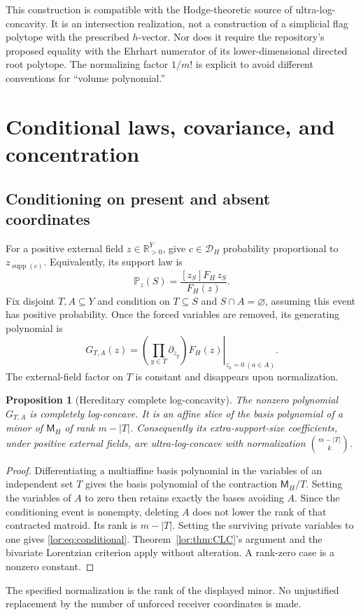 \documentclass[11pt]{article}
\numberwithin{equation}{section}
\newtheorem{proposition}[theorem]{Proposition}
\theoremstyle{definition}
\newcommand{\R}{\mathbb R}
\newcommand{\supp}{\operatorname{supp}}
\newcommand{\PP}{\mathbb P}
\newcommand{\cD}{\mathcal D}
\begin{document}
This construction is compatible with the Hodge-theoretic source of
ultra-log-concavity. It is an intersection realization, not a construction of
a simplicial flag polytope with the prescribed $h$-vector. Nor does it require
the repository's proposed equality with the Ehrhart numerator of its
lower-dimensional directed root polytope. The normalizing factor $1/m!$ is
explicit to avoid different conventions for ``volume polynomial.''

\section{Conditional laws, covariance, and concentration}
\label{lor:sec:probability}
\subsection{Conditioning on present and absent coordinates}
For a positive external field $z\in\R_{>0}^{Y}$, give $c\in\cD_H$
probability proportional to $z_{\supp(c)}$. Equivalently, its support law is
\begin{equation}
 \PP_z(S)=\frac{[z_S]F_H\,z_S}{F_H(z)}.
 \label{lor:eq:law}
\end{equation}
Fix disjoint $T,A\subseteq Y$ and condition on $T\subseteq S$ and
$S\cap A=\varnothing$, assuming this event has positive probability. Once
the forced variables are removed, its generating polynomial is
\begin{equation}
 G_{T,A}(z)=
 \left.\left(\prod_{y\in T}\partial_{z_y}\right)F_H(z)
                          \right|_{z_a=0\ (a\in A)}.
 \label{lor:eq:conditional}
\end{equation}
The external-field factor on $T$ is constant and disappears upon
normalization.

\begin{proposition}[Hereditary complete log-concavity]\label{lor:prop:conditional}
The nonzero polynomial $G_{T,A}$ is completely log-concave. It is an affine
slice of the basis polynomial of a minor of $\mathsf M_H$ of rank $m-|T|$.
Consequently its extra-support-size coefficients, under positive external
fields, are ultra-log-concave with normalization
$\binom{m-|T|}k$.
\end{proposition}
\begin{proof}
Differentiating a multiaffine basis polynomial in the variables of an
independent set $T$ gives the basis polynomial of the contraction $\mathsf M_H/T$.
Setting the variables of $A$ to zero then retains exactly the bases avoiding
$A$. Since the conditioning event is nonempty, deleting $A$ does not lower
the rank of that contracted matroid. Its rank is $m-|T|$.
Setting the surviving private variables to one gives
\eqref{lor:eq:conditional}. Theorem~\ref{lor:thm:CLC}'s argument and the bivariate
Lorentzian criterion apply without alteration. A rank-zero case is a
nonzero constant.
\end{proof}
The specified normalization is the rank of the displayed minor. No
unjustified replacement by the number of unforced receiver coordinates is
made.
\end{document}
